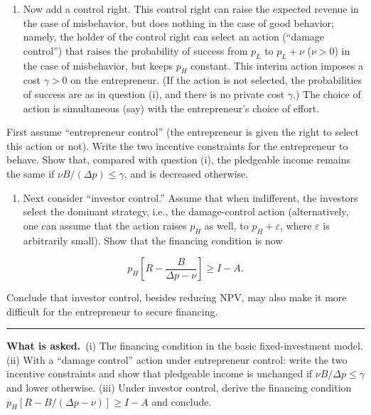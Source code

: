 \documentclass[11pt,a4paper]{article}
\newcommand{\asked}{\par\medskip\noindent\textbf{What is asked.}~}
\newcommand{\dpp}{\Delta p}
\providecommand{\tightlist}{\setlength{\itemsep}{0pt}\setlength{\parskip}{0pt}}
\newcommand{\stmtend}{\par\endgroup\nopagebreak\noindent\rule{\linewidth}{0.4pt}\par\medskip}
\begin{document}
\begin{enumerate}
\def\labelenumi{(\roman{enumi})}
\setcounter{enumi}{1}
\tightlist
\item
  Now add a control right. This control right can raise the expected revenue in the case of
  misbehavior, but does nothing in the case of good behavior; namely, the holder of the control
  right can select an action (``damage control'') that raises the probability of success from
  \(p_L\) to \(p_L + \nu\) (\(\nu > 0\)) in the case of misbehavior, but keeps \(p_H\) constant.
  This interim action imposes a cost \(\gamma > 0\) on the entrepreneur. (If the action is not
  selected, the probabilities of success are as in question (i), and there is no private cost
  \(\gamma\).) The choice of action is simultaneous (say) with the entrepreneur's choice of effort.
\end{enumerate}

First assume ``entrepreneur control'' (the entrepreneur is given the right to select this action or
not). Write the two incentive constraints for the entrepreneur to behave. Show that, compared with
question (i), the pledgeable income remains the same if \(\nu B/(\Delta p) \leqslant \gamma\), and
is decreased otherwise.

\begin{enumerate}
\def\labelenumi{(\roman{enumi})}
\setcounter{enumi}{2}
\tightlist
\item
  Next consider ``investor control.'' Assume that when indifferent, the investors select the
  dominant strategy, i.e., the damage-control action (alternatively, one can assume that the action
  raises \(p_H\) as well, to \(p_H + \varepsilon\), where \(\varepsilon\) is arbitrarily small).
  Show that the financing condition is now
\end{enumerate}

\[p_H\left[R - \frac{B}{\Delta p - \nu}\right] \geqslant I - A.\]

Conclude that investor control, besides reducing NPV, may also make it more difficult for the
entrepreneur to secure financing.
\stmtend

\asked (i) The financing condition in the basic fixed-investment model. (ii) With a ``damage control'' action under entrepreneur control: write the two incentive constraints and show that pledgeable income is unchanged if $\nu B/\dpp\le\gamma$ and lower otherwise. (iii) Under investor control, derive the financing condition $p_H[R-B/(\dpp-\nu)]\ge I-A$ and conclude.
\end{document}
